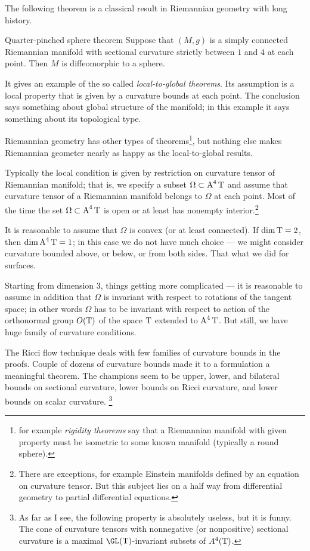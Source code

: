 The following theorem is a classical result in Riemannian geometry with long history.

\begin{thm}{Quarter-pinched sphere theorem}
Suppose that $(M,g)$ is a simply connected Riemannian manifold with sectional curvature strictly between $1$ and $4$ at each point.
Then $M$ is diffeomorphic to a sphere.
\end{thm}

It gives an example of the so called \emph{local-to-global theorems}.
Its assumption is a local property that is given by a curvature bounds at each point.
The conclusion says something about global structure of the manifold; in this example it says something about its topological type.

Riemannian geometry has other types of theorems\footnote{for example \emph{rigidity theorems} say that a Riemannian manifold with given property must be isometric to some known manifold (typically a round sphere).}, but nothing else makes Riemannian geometer nearly as happy as the local-to-global results.

Typically the local condition is given by restriction on curvature tensor of Riemannian manifold;
that is, we specify a subset $\Omega\subset \operatorname{\rm A}^4\operatorname{\rm T}$ and assume that curvature tensor of a Riemannian manifold belongs to $\Omega$ at each point.
Most of the time the set $\Omega\subset \operatorname{\rm A}^4\operatorname{\rm T}$ is open or at least has nonempty interior.\footnote{There are exceptions, for example Einstein manifolds defined by an equation on curvature tensor.
But this subject lies on a half way from differential geometry to partial differential equations.}

It is reasonable to assume that $\Omega$ is convex (or at least connected).
If $\operatorname{\rm dim}\nolimits\operatorname{\rm T}=2$, then $\operatorname{\rm dim}\nolimits\operatorname{\rm A}^4\operatorname{\rm T}=1$;
in this case we do not have much choice --- we might consider curvature bounded above, or below, or from both sides.
That what we did for surfaces.

Starting from dimension 3, things getting more complicated --- it is reasonable to assume in addition that $\Omega$ is invariant with respect to rotations of the tangent space;
in other words $\Omega$ has to be invariant with respect to action of the orthonormal group $O(\operatorname{\rm T})$ of the space $\operatorname{\rm T}$ extended to $\operatorname{\rm A}^4\operatorname{\rm T}$.
But still, we have huge family of curvature conditions.

The Ricci flow technique deals with few families of curvature bounds in the proofs.
Couple of dozens of curvature bounds made it to a formulation a meaningful theorem.
The champions seem to be upper, lower, and bilateral bounds on sectional curvature, lower bounds on Ricci curvature, and lower bounds on scalar curvature.%
\footnote{As far as I see, the following property is absolutely useless, but it is funny.
The cone of curvature tensors with nonnegative (or nonpositive) sectional curvature is a maximal $\GL(\T)$-invariant subsets of $A^4(\operatorname{\rm T})$.}
 
